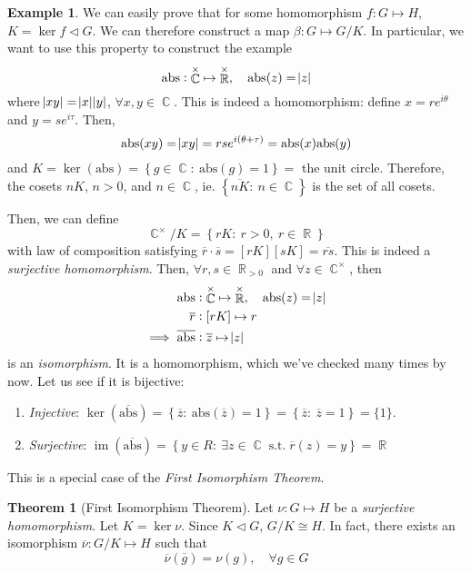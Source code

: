 \documentclass[11pt]{amsart} %
\theoremstyle{definition}
\newtheorem{theorem}[definition]{Theorem}
\newtheorem{example}[definition]{Example}
\theoremstyle{definition}
\DeclareMathOperator{\R}{\mathbb{R}}
\DeclareMathOperator{\Com}{\mathbb{C}}
\DeclareMathOperator{\suchthat}{\text{ s.t. }}
\DeclareMathOperator{\im}{im}
\numberwithin{equation}{section}
\newcommand{\condset}[4]{\left\{ #1  : \: #2 #3 #4 \right\}}
\newcommand{\qgroup}[2]{#1 / #2}
\begin{document}
\begin{example}
	We can easily prove that for some homomorphism $f: G \mapsto H$, $K= \ker f \lhd G$. We can therefore construct a map $\beta : G \mapsto G/K$. In particular, we want to use this property to construct the example
	$$ \text{abs} : \Com^{\times} \mapsto \R^{\times }, \quad \text{abs} (z) = \abs{z}$$
	where $ \abs{xy} = \abs{x} \abs{y} $, $\forall x,y \in \Com$. This is indeed a homomorphism: define $x=r e^{i \theta}$ and $y=s e^{i \tau}$. Then,
	$$ \text{abs} (xy) = \abs{ xy} = rs e^{i(\theta+ \tau)} = \text{abs}(x ) \text{abs} (y) $$
	and $K = \ker (\text{abs}) = \condset{g \in \Com}{\text{abs} (g)}{ = }{1 } = $ the unit circle. Therefore, the cosets $nK$, $n > 0$, and $n \in \Com$, ie. $\condset{ \overline{nK} }{ n }{\in }{\Com }$ is the set of all cosets.
	
	Then, we can define
	$$ \qgroup{\Com^{\times } }{K} = \condset{ rK}{r > 0,}{ \: r \in \R}{} $$
	with law of composition satisfying $\overline{r} \cdot \overline{s} = [rK] [sK] = \overline{rs}$. This is indeed a \textit{surjective homomorphism}. Then, $\forall r,s \in \R_{>0}$ and $\forall z \in \Com^{\times}$, then
	\begin{align*}
	\text{abs} &: \Com^{\times} \mapsto \R^{\times }, \quad \text{abs} (z) = \abs{z} \\
	\overline{r} &: [rK] \mapsto r \\
	\implies \overline{\text{abs}} &: \overline{z} \overset{ \overline{ }  }{\mapsto }  \abs{z}
	\end{align*}
	is an \textit{isomorphism}. It is a homomorphism, which we've checked many times by now. Let us see if it is bijective:
	\begin{enumerate}[  label=(\alph*)]
		\item \textit{Injective}: $\ker (\overline{\text{abs}}) = \condset{ \overline{z} }{ \text{abs} (\overline{z}  )}{  = }{1} = \condset{ \overline{ z }}{ \overline{ z } }{=}{ 1} = \{ 1 \}$.
		\item \textit{Surjective}: $\im (\overline{ \text{abs} }) = \condset{ y \in R}{\exists z \in \Com \suchthat}{ \overline{r} (z) }{= y} = \R$
	\end{enumerate}
	This is a special case of the \textit{First Isomorphism Theorem}.
\end{example}

\begin{theorem}[First Isomorphism Theorem]
	Let $\nu : G \mapsto H$ be a \textit{surjective homomorphism}. Let $K = \ker \nu$. Since $K \lhd G$, $ G / K \cong H$. In fact, there exists an isomorphism $\overline{\nu } : G/K \mapsto H$ such that
	\begin{equation}
	\label{FITcondition}
	\tag{$\ast$}
		\overline{\nu} (\overline{g}) = \nu (g), \quad \forall g \in G
	\end{equation}
\end{theorem}
\end{document}
